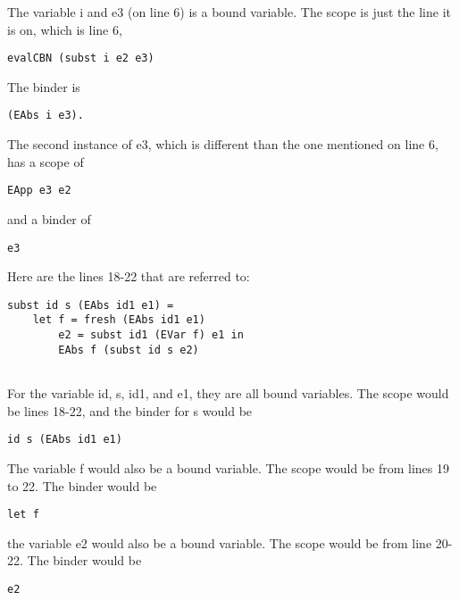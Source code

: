 \documentclass{article}
\theoremstyle{theorem}
\theoremstyle{definition}
\theoremstyle{remark}
\begin{document}
\noindent\newline\newline The variable i and e3 (on line 6) is a bound variable. The scope is just the line it is on, which is line 6, 
\begin{verbatim}
evalCBN (subst i e2 e3)
\end{verbatim}
The binder is 
\begin{verbatim}
(EAbs i e3).
\end{verbatim}

\noindent\newline\newline The second instance of e3, which is different than the one mentioned on line 6, has a scope of 
\begin{verbatim}
EApp e3 e2
\end{verbatim}
and a binder of
\begin{verbatim}
e3
\end{verbatim}


\noindent\newline\newline\newline Here are the lines 18-22 that are referred to:
\begin{verbatim}
subst id s (EAbs id1 e1) =
    let f = fresh (EAbs id1 e1)
        e2 = subst id1 (EVar f) e1 in 
        EAbs f (subst id s e2)
        
\end{verbatim}

\noindent\newline For the variable id, s, id1, and e1, they are all bound variables. The scope would be lines 18-22, and the binder for s would be 
\begin{verbatim} 
id s (EAbs id1 e1)
\end{verbatim}

\noindent\newline The variable f would also be a bound variable. The scope would be from lines 19 to 22. The binder would be 
\begin{verbatim}
let f
\end{verbatim}

\noindent\newline the variable e2 would also be a bound variable. The scope would be from line 20-22. The binder would be 
\begin{verbatim}
e2
\end{verbatim}


\noindent\newline 
\end{document}
